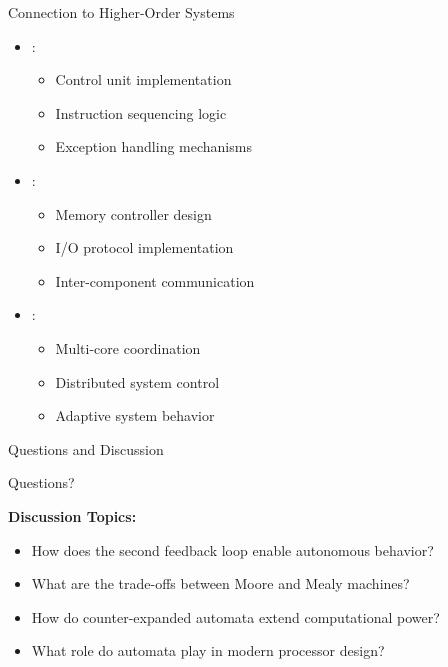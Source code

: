 \begin{frame}{Connection to Higher-Order Systems}
\begin{itemize}
\item {}:
\begin{itemize}
\item Control unit implementation
\item Instruction sequencing logic
\item Exception handling mechanisms
\end{itemize}
\vspace{0.3cm}
\item {}:
\begin{itemize}
\item Memory controller design
\item I/O protocol implementation
\item Inter-component communication
\end{itemize}
\vspace{0.3cm}
\item {}:
\begin{itemize}
\item Multi-core coordination
\item Distributed system control
\item Adaptive system behavior
\end{itemize}
\end{itemize}
\end{frame}

\begin{frame}{Questions and Discussion}
\begin{center}
\Large
Questions?

\vspace{1cm}

\normalsize
\textbf{Discussion Topics:}
\begin{itemize}
\item How does the second feedback loop enable autonomous behavior?
\item What are the trade-offs between Moore and Mealy machines?
\item How do counter-expanded automata extend computational power?
\item What role do automata play in modern processor design?
\end{itemize}

\end{center}
\end{frame}

